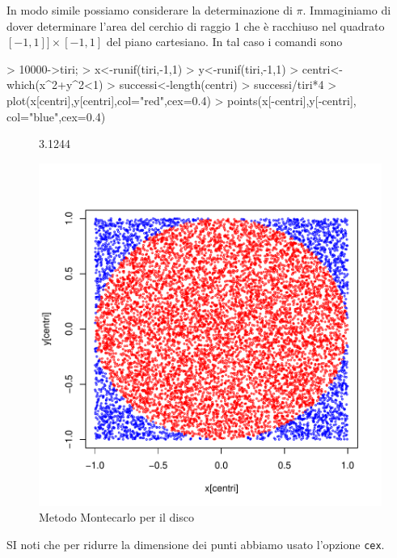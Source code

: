 \documentclass[onecolumn,11pt]{book}
\begin{document}
In modo simile possiamo considerare la determinazione di $\pi$. Immaginiamo di dover determinare l'area del cerchio di raggio 1 che \`e racchiuso nel quadrato $[-1,1]]\times[-1,1]$ del piano cartesiano.
In tal caso i comandi sono
\begin{Schunk}
\begin{Sinput}
> 10000->tiri;
> x<-runif(tiri,-1,1)		 
> y<-runif(tiri,-1,1)
> centri<-which(x^2+y^2<1)	 
> successi<-length(centri)
> successi/tiri*4                    
> plot(x[centri],y[centri],col="red",cex=0.4)   
> points(x[-centri],y[-centri], col="blue",cex=0.4)  
\end{Sinput}
\end{Schunk}
\begin{figure}[htbp]
\begin{center}
\begin{Schunk}
\begin{Soutput}
[1] 3.1244
\end{Soutput}
\end{Schunk}
\includegraphics{statisticaconR-122}
\caption{Metodo Montecarlo per il disco}
\label{fig:newton}
\end{center}
\end{figure}
 SI noti che per ridurre la dimensione dei punti abbiamo usato l'opzione \texttt{cex}.
\end{document}

